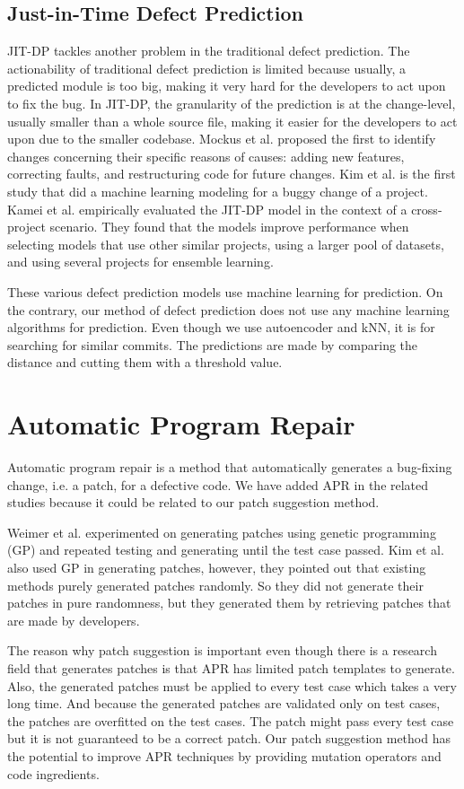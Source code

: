 \subsection{Just-in-Time Defect Prediction}
JIT-DP tackles another problem in the traditional defect prediction.
The actionability of traditional defect prediction is limited because usually, a predicted module is too big, making it very hard for the developers to act upon to fix the bug.
In JIT-DP, the granularity of the prediction is at the change-level, usually smaller than a whole source file, making it easier for the developers to act upon due to the smaller codebase.
Mockus et al. \cite{mockus2000identifying} proposed the first to identify changes concerning their specific reasons of causes: adding new features, correcting faults, and restructuring code for future changes.
Kim et al. \cite{kim2008classifying} is the first study that did a machine learning modeling for  a buggy change of a project.
Kamei et al. \cite{kamei2016studying} empirically evaluated the JIT-DP model in the context of a cross-project scenario.
They found that the models improve performance when selecting models that use other similar projects, using a larger pool of datasets, and using several projects for ensemble learning.  

These various defect prediction models use machine learning for prediction.
On the contrary, our method of defect prediction does not use any machine learning algorithms for prediction.
Even though we use autoencoder and kNN, it is for searching for similar commits.
The predictions are made by comparing the distance and cutting them with a threshold value.

\section{Automatic Program Repair}
Automatic program repair is a method that automatically generates a bug-fixing change, i.e. a patch, for a defective code.
We have added APR in the related studies because it could be related to our  patch suggestion method.

Weimer et al. \cite{weimer2009automatically} experimented on generating patches using genetic programming (GP) and repeated testing and generating until the test case passed. 
Kim et al. \cite{kim2013automatic} also used GP in generating patches, however, they pointed out that existing methods purely generated patches randomly. 
So they did not generate their patches in pure randomness, but they generated them by retrieving patches that are made by developers. 

The reason why patch suggestion is important even though there is a research field that generates patches is that APR has limited patch templates to generate.
Also, the generated patches must be applied to every test case which takes a very long time.
And because the generated patches are validated only on test cases, the patches are overfitted on the test cases.
The patch might pass every test case but it is not guaranteed to be a correct patch.
Our patch suggestion method has the potential to improve APR techniques by providing mutation operators and code ingredients.

